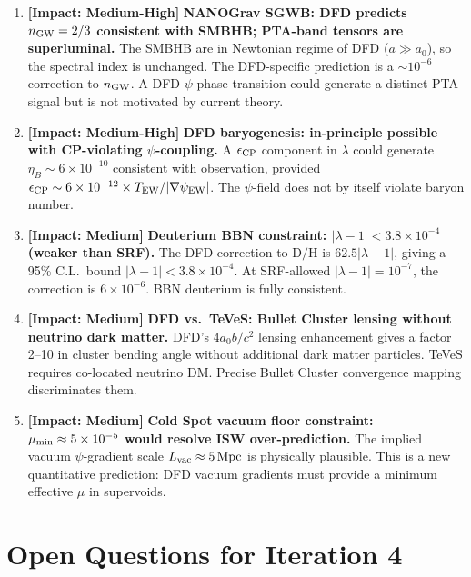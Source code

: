 \documentclass[11pt]{article}
\newcommand{\ee}[1]{\times 10^{#1}}
\newcommand{\lambdaone}{|\lambda-1|}
\newcommand{\mufd}{\mu}
\newcommand{\azero}{a_0}
\begin{document}
\begin{enumerate}
\item \textbf{[Impact: Medium-High]} \textbf{NANOGrav SGWB: DFD predicts
$n_{\rm GW} = 2/3$ consistent with SMBHB; PTA-band tensors are superluminal.}
The SMBHB are in Newtonian regime of DFD ($a \gg a_0$), so the spectral
index is unchanged.  The DFD-specific prediction is a $\sim 10^{-6}$
correction to $n_{\rm GW}$.  A DFD $\psi$-phase transition could
generate a distinct PTA signal but is not motivated by current theory.

\item \textbf{[Impact: Medium-High]} \textbf{DFD baryogenesis: in-principle
possible with CP-violating $\psi$-coupling.}  A $\epsilon_{\rm CP}$ component
in $\lambda$ could generate $\eta_B \sim 6\ee{-10}$ consistent with
observation, provided $\epsilon_{\rm CP} \sim 6\ee{-12}\times T_{\rm EW}/|\nabla\psi_{\rm EW}|$.
The $\psi$-field does not by itself violate baryon number.

\item \textbf{[Impact: Medium]} \textbf{Deuterium BBN constraint:
$\lambdaone < 3.8\ee{-4}$ (weaker than SRF).}  The DFD correction to
$\text{D/H}$ is $62.5\lambdaone$, giving a 95\% C.L.\ bound
$\lambdaone < 3.8\ee{-4}$.  At SRF-allowed $\lambdaone = 10^{-7}$,
the correction is $6\ee{-6}$.  BBN deuterium is fully consistent.

\item \textbf{[Impact: Medium]} \textbf{DFD vs.\ TeVeS: Bullet Cluster
lensing without neutrino dark matter.}  DFD's $4\azero b/c^2$ lensing
enhancement gives a factor 2--10 in cluster bending angle without
additional dark matter particles.  TeVeS requires co-located neutrino
DM.  Precise Bullet Cluster convergence mapping discriminates them.

\item \textbf{[Impact: Medium]} \textbf{Cold Spot vacuum floor constraint:
$\mufd_{\rm min} \approx 5\ee{-5}$ would resolve ISW over-prediction.}
The implied vacuum $\psi$-gradient scale $L_{\rm vac} \approx 5\,{\rm Mpc}$
is physically plausible.  This is a new quantitative prediction:
DFD vacuum gradients must provide a minimum effective $\mu$ in supervoids.

\end{enumerate}

\section{Open Questions for Iteration 4}
\label{sec:open-questions}
\end{document}
